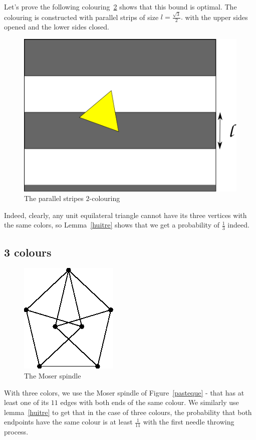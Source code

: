 \documentclass[a4paper,11pt]{article}
\theoremstyle{definition}
\theoremstyle{remark}
\begin{document}
Let's prove the following colouring~\ref{color} shows that this bound is 
optimal. The colouring is constructed with parallel strips of size 
$l = \frac {\sqrt3}{2}.$ with the upper sides opened and the lower sides closed.   
\begin{figure}[h]
\center
\includegraphics[scale=0.5]{path6509.png}
\caption{\label{couleur} The parallel stripes $2$-colouring}
\end{figure}

Indeed, clearly, any unit equilateral triangle cannot have its three vertices
with the same colors, so Lemma~\ref{huitre} shows that we get a probability of 
$\frac{1}{3}$ indeed.

\subsection{3 colours}
\begin{figure}[h]
\label{pasteque}
\center
\includegraphics[scale=0.4]{T.png}
\caption{\label{color} The Moser spindle}
\end{figure}


 With three colors, we use the Moser spindle of Figure~\ref{pasteque} - that 
 has at least one of its $11$ edges with both ends of the same colour.
 We similarly use lemma~\ref{huitre} to get that in the case of three colours,
 the probability that both endpoints have the same colour is at least 
 $\frac{1}{11}$ with the first needle throwing process. 
\end{document}
